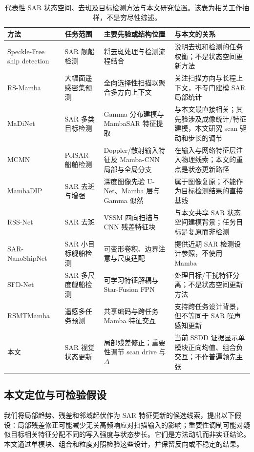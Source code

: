 \documentclass[UTF8,12pt,a4paper]{ctexart}
\begin{document}
\begin{table}[H]\centering\scriptsize
\caption{代表性 SAR 状态空间、去斑及目标检测方法与本文研究位置。该表为相关工作抽样，不是穷尽性综述。}
\label{tab:related_position}
\begin{tabularx}{\linewidth}{p{3.2cm}p{2.25cm}p{3.7cm}X}
\toprule
方法 & 任务范围 & 主要先验或结构位置 & 与本文的关系\\
\midrule
Speckle-Free ship detection\cite{specklefree} & SAR 舰船检测 & 将去斑处理与检测流程结合 & 说明去斑和检测的任务权衡；不是状态空间更新方法\\
RS-Mamba\cite{rs_mamba} & 大幅面遥感密集预测 & 全向选择性扫描以聚合多方向上下文 & 关注扫描方向与长程上下文，不专门建模 SAR 局部统计\\
MaDiNet\cite{madinet} & SAR 多类目标检测 & Gamma 分布建模与 MambaSAR 特征提取 & 与本文最直接相关；其先验涉及成像统计/特征建模，本文研究 scan 驱动和步长的调节\\
MCMN\cite{mcmn} & PolSAR 船舶检测 & Doppler/散射输入特征及 Mamba-CNN 局部与全局分支 & 在输入与网络特征层注入物理线索；本文的重点是状态更新路径\\
MambaDIP\cite{mambadip} & SAR 去斑与增强 & 深度图像先验 U-Net、Mamba 层与 Gamma 似然 & 属于图像复原；不能作为目标检测结果的直接基线\\
RSS-Net\cite{rssnet} & SAR 去斑 & VSSM 四向扫描与 CNN 残差特征块 & 与本文共享 SAR 状态空间建模背景；任务目标是复原而非检测\\
SAR-NanoShipNet\cite{sarnano} & SAR 小目标舰船检测 & 可变形卷积、边界注意与尺度适配 & 提供近期 SAR 检测设计参照，不使用 Mamba\\
SFD-Net\cite{sfdnet} & SAR 多尺度舰船检测 & 可学习特征解耦与 Star-Fusion FPN & 处理目标/干扰特征分离；不是状态空间更新方法\\
RSMTMamba\cite{rstmtmamba} & 遥感多任务预测 & 共享编码与跨任务 Mamba 特征交互 & 支持跨任务设计背景，但不等同于 SAR 噪声感知更新\\
本文 & SAR 视觉状态更新 & 局部残差修正；重要性调节 scan drive 与 $\Delta$ & 当前 SSDD 证据显示单模块正向均值、组合负交互；不作普遍领先主张\\
\bottomrule
\end{tabularx}
\end{table}

\subsection{本文定位与可检验假设}
我们将局部趋势、残差和邻域起伏作为 SAR 特征更新的候选线索，提出以下假设：局部残差修正可能减少无关高频响应对扫描输入的影响；重要性调制可能对疑似目标相关特征分配不同的写入强度与状态步长。它们是方法动机而非实证结论。本文通过单模块、组合和粒度对照检验这些设计，并保留反向或不稳定的结果。
\end{document}
